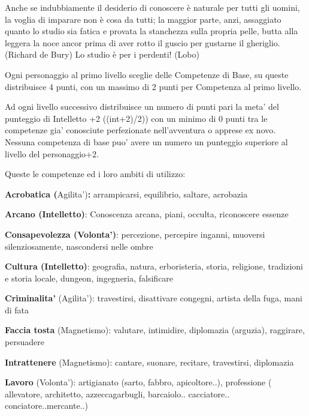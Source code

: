 \documentclass[a4paper,11pt,twoside,openany]{dndbook}
\begin{document}
\begin{quotebox}
Anche se indubbiamente il desiderio di conoscere è naturale per tutti gli uomini, la voglia di imparare non è cosa da tutti; la maggior parte, anzi, assaggiato quanto lo studio sia fatica e provata la stanchezza sulla propria pelle, butta alla leggera la noce ancor prima di aver rotto il guscio per gustarne il gheriglio. (Richard de Bury)\linebreak\linebreak
Lo studio è per i perdenti! (Lobo)
\end{quotebox}

Ogni personaggio al primo livello sceglie delle Competenze di Base, su queste distribuisce 4 punti, con un massimo di 2 punti per Competenza al primo livello.

Ad ogni livello successivo distribuisce un numero di punti pari la meta' del punteggio di Intelletto +2 ((int+2)/2)) con un minimo di 0 punti tra le competenze gia' conosciute perfezionate nell'avventura o apprese ex novo. Nessuna competenza di base puo' avere un numero un punteggio superiore al livello del personaggio+2.

\bigskip

Queste le competenze ed i loro ambiti di utilizzo:

\textbf{Acrobatica (}Agilita')\textbf{:} arrampicarsi, equilibrio, saltare, acrobazia

\textbf{Arcano (Intelletto)}: Conoscenza arcana, piani, occulta, riconoscere essenze

\textbf{Consapevolezza (Volonta')}: percezione, percepire inganni, muoversi silenziosamente, nascondersi nelle ombre

\textbf{Cultura (Intelletto)}: geografia, natura, erboristeria, storia, religione, tradizioni e storia locale, dungeon, ingegneria, falsificare

\textbf{Criminalita'} (Agilita'): travestirsi, disattivare congegni, artista della fuga, mani di fata

\textbf{Faccia tosta} (Magnetismo): valutare, intimidire, diplomazia (arguzia), raggirare, persuadere

\textbf{Intrattenere} (Magnetismo): cantare, suonare, recitare, travestirsi, diplomazia

\textbf{Lavoro} (Volonta'): artigianato (sarto, fabbro, apicoltore..), professione ( allevatore, architetto, azzeccagarbugli, barcaiolo..
cacciatore.. conciatore..mercante..)
\end{document}
